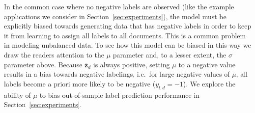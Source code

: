 

In the common case where no negative labels are observed (like the example applications we consider in Section~\ref{sec:experiments}), the model must be explicitly biased towards generating data that has negative labels in order to keep it from learning to assign all labels to all documents.   This is a common problem in modeling unbalanced data.  To see how this model can be biased in this way we draw the readers attention to the $\mu$ parameter and, to a lesser extent, the $\sigma$ parameter above.  Because $\bar{\mathbf{z}}_d$ is always positive, setting $\mu$ to a negative value results in a bias towards negative labelings, i.e.~for large negative values of $\mu$, all labels become a priori more likely to be negative ($y_{l,d}=-1$).  We explore the ability of $\mu$ to bias out-of-sample label prediction performance in Section~\ref{sec:experiments}.


